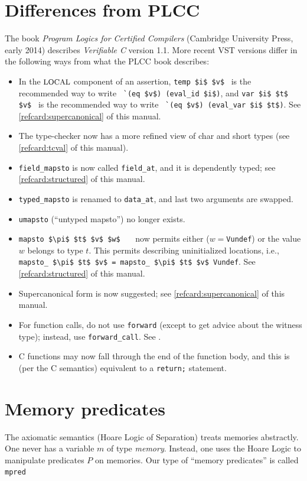 \documentclass[12pt,fleqn,openany,oneside,showtrims]{memoir}
\newcommand{\ychapter}[2]{\chapter[#1]{#1 \hfill \normalsize #2}}
\begin{document}
\ychapter{Differences from PLCC}{}
The book \emph{Program Logics for Certified Compilers}
(Cambridge University Press, early 2014) describes
\emph{Verifiable C} version 1.1.
More recent VST versions differ in the following ways
from what the PLCC book describes:
\begin{itemize}
\item In the $\mbox{\small LOCAL}$ component of an assertion, \newline
\lstinline{temp $i$ $v$}~ is the recommended
way to write ~\lstinline{`(eq $v$) (eval_id $i$)},
and \newline
\lstinline{var $i$ $t$ $v$}~ is the recommended
way to write ~\lstinline{`(eq $v$) (eval_var $i$ $t$)}.
See \autoref{refcard:supercanonical} of this manual.
\item The type-checker now has a more refined view of char and short types
     (see \autoref{refcard:tcval} of this manual).
\item \lstinline{field_mapsto} is now called
\lstinline{field_at}, and it is dependently
typed; see \autoref{refcard:structured} of this manual.
\item \lstinline{typed_mapsto} is renamed to \lstinline{data_at}, and
   last two arguments are swapped.
\item \lstinline{umapsto} (``untyped mapsto'') no
longer exists.
\item \lstinline{mapsto $\pi$ $t$ $v$ $w$}
~~~now permits either ($w=$\lstinline{Vundef})
or the value $w$ belongs to type $t$.
This permits describing uninitialized locations,
i.e., \lstinline{mapsto_ $\pi$ $t$ $v$ = mapsto_ $\pi$ $t$ $v$ Vundef}.
See \autoref{refcard:structured} of this manual.
\item Supercanonical form is now suggested; see
\autoref{refcard:supercanonical} of this manual.
\item For function calls, do not use \lstinline{forward}
(except to get advice about the witness type);
instead, use \lstinline{forward_call}.  See .
\item C functions may now fall through the end of the function body,
and this is (per the C semantics) equivalent to a \lstinline{return;}
statement.
\end{itemize}
\ychapter{Memory predicates}{}

The axiomatic semantics (Hoare Logic of Separation) treats
memories abstractly.  One never has a variable $m$ of type
\emph{memory}.  Instead, one uses the Hoare Logic to manipulate
predicates $P$ on memories.
Our type of ``memory predicates'' is called \lstinline{mpred}
\end{document}
